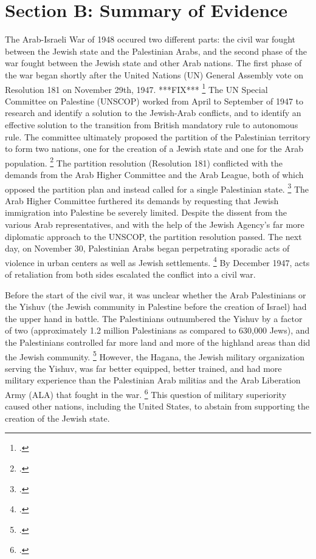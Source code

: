 \documentclass[12pt]{turabian-researchpaper}
\begin{document}
\section{Section B: Summary of Evidence}
The Arab-Israeli War of 1948 occured two different parts: the civil war fought between the Jewish state and the Palestinian Arabs, and the second phase of the war fought between the Jewish state and other Arab nations.  The first phase of the war began shortly after the United Nations (UN) General Assembly vote on Resolution 181 on November 29th, 1947. ***FIX***
\footcite[][]{tal}
The UN Special Committee on Palestine (UNSCOP) worked from April to September of 1947 to research and identify a solution to the Jewish-Arab conflicts, and to identify an effective solution to the transition from British mandatory rule to autonomous rule.  The committee ultimately proposed the partition of the Palestinian territory to form two nations, one for the creation of a Jewish state and one for the Arab population.
\footcite[][22]{pappe}
The partition resolution (Resolution 181) conflicted with the demands from the Arab Higher Committee and the Arab League, both of which opposed the partition plan and instead called for a single Palestinian state.
\footcite[][23]{pappe}
The Arab Higher Committee furthered its demands by requesting that Jewish immigration into Palestine be severely limited.  Despite the dissent from the various Arab representatives, and with the help of the Jewish Agency's far more diplomatic approach to the UNSCOP, the partition resolution passed.  The next day, on November 30, Palestinian Arabs began perpetrating sporadic acts of violence in urban centers as well as Jewish settlements.
\footcite[][77]{morris}
By December 1947, acts of retaliation from both sides escalated the conflict into a civil war.



Before the start of the civil war, it was unclear whether the Arab Palestinians or the Yishuv (the Jewish community in Palestine before the creation of Israel) had the upper hand in battle.  The Palestinians outnumbered the Yishuv by a factor of two (approximately 1.2 million Palestinians as compared to 630,000 Jews), and the Palestinians controlled far more land and more of the highland areas than did the Jewish community.
\footcite[][30]{bartal}
However, the Hagana, the Jewish military organization serving the Yishuv, was far better equipped, better trained, and had more military experience than the Palestinian Arab militias and the Arab Liberation Army (ALA) that fought in the war.
\footcite[][81]{morris}
This question of military superiority caused other nations, including the United States, to abstain from supporting the creation of the Jewish state.
\end{document}
